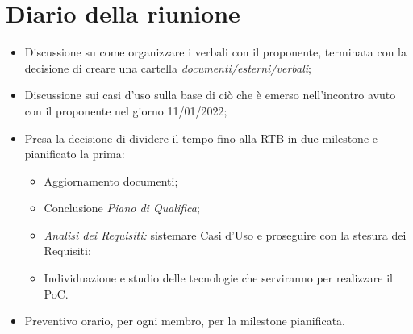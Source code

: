\section{Diario della riunione}
\begin{itemize}
  \item Discussione su come organizzare i verbali con il proponente, terminata con la decisione di creare una cartella \textit{documenti/esterni/verbali};
  \item Discussione sui casi d'uso sulla base di ciò che è emerso nell'incontro avuto con il proponente nel giorno 11/01/2022;
  \item Presa la decisione di dividere il tempo fino alla RTB in due milestone e pianificato la prima:
    \begin{itemize}
      \item Aggiornamento documenti;
      \item Conclusione \textit{Piano di Qualifica};
      \item \textit{Analisi dei Requisiti:} sistemare Casi d'Uso e proseguire con la stesura dei Requisiti;
      \item Individuazione e studio delle tecnologie che serviranno per realizzare il PoC.
    \end{itemize}
  \item Preventivo orario, per ogni membro, per la milestone pianificata. 
\end{itemize}
